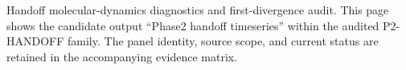 Handoff molecular-dynamics diagnostics and first-divergence audit. This page shows the candidate output ``Phase2 handoff timeseries'' within the audited P2-HANDOFF family. The panel identity, source scope, and current status are retained in the accompanying evidence matrix.
